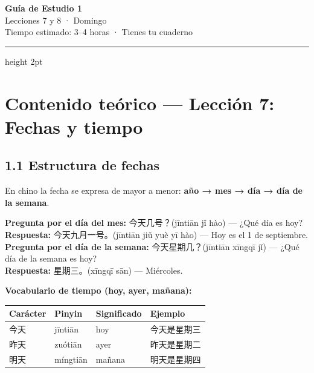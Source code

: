 \documentclass[12pt, a4paper]{article}
\begin{document}
\begin{center}
{\LARGE \textbf{\textcolor{azul}{Guía de Estudio 1}}}\\[4pt]
{\large Lecciones 7 y 8 · Domingo}\\[2pt]
{\normalsize Tiempo estimado: 3--4 horas · Tienes tu cuaderno}
\end{center}

\vspace{0.5em}
\hrule height 2pt
\vspace{1em}

\section{Contenido teórico — Lección 7: Fechas y tiempo}

\subsection{1.1 Estructura de fechas}

En chino la fecha se expresa de mayor a menor: \textbf{año → mes → día → día de la semana}.

\begin{cuadroazul}
\textbf{Pregunta por el día del mes:} \quad 今天几号？\quad (jīntiān jǐ hào) — ¿Qué día es hoy?\\[4pt]
\textbf{Respuesta:} \quad 今天九月一号。\quad (jīntiān jiǔ yuè yī hào) — Hoy es el 1 de septiembre.\\[6pt]
\textbf{Pregunta por el día de la semana:} \quad 今天星期几？\quad (jīntiān xīngqī jǐ) — ¿Qué día de la semana es hoy?\\[4pt]
\textbf{Respuesta:} \quad 星期三。\quad (xīngqī sān) — Miércoles.
\end{cuadroazul}

\vspace{0.5em}
\noindent\textbf{Vocabulario de tiempo (hoy, ayer, mañana):}

\begin{center}
\begin{tabular}{llll}
\toprule
\textbf{Carácter} & \textbf{Pinyin} & \textbf{Significado} & \textbf{Ejemplo} \\
\midrule
今天 & jīntiān & hoy & 今天是星期三 \\
昨天 & zuótiān & ayer & 昨天是星期二 \\
明天 & míngtiān & mañana & 明天是星期四 \\
\bottomrule
\end{tabular}
\end{center}
\end{document}

